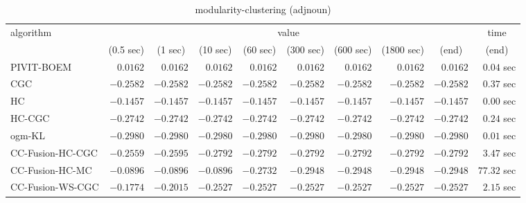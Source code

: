 \begin{table}[H]
\scriptsize
\centering
\caption{modularity-clustering (adjnoun)}
\label{tab:anytimetable-modularity-clustering-adjnoun}
\begin{tabular}{lrrrrrrrrr}
\toprule
           algorithm &                                   \multicolumn{8}{c}{value} & \multicolumn{1}{c}{time}   \\  
\cmidrule(lr){2-9}\cmidrule(lr){10-10}   
                     & \multicolumn{1}{c}{(0.5 sec)} & \multicolumn{1}{c}{(1 sec)} & \multicolumn{1}{c}{(10 sec)} & \multicolumn{1}{c}{(60 sec)} & \multicolumn{1}{c}{(300 sec)} & \multicolumn{1}{c}{(600 sec)} & \multicolumn{1}{c}{(1800 sec)} & \multicolumn{1}{c}{(end)} & \multicolumn{1}{c}{(end)}   \\ \midrule 
          PIVIT-BOEM & $       0.0162$ & $       0.0162$ & $       0.0162$ & $       0.0162$ & $       0.0162$ & $       0.0162$ & $       0.0162$ & $       0.0162$ & $         0.04$ sec   \\ 
                 CGC & $      -0.2582$ & $      -0.2582$ & $      -0.2582$ & $      -0.2582$ & $      -0.2582$ & $      -0.2582$ & $      -0.2582$ & $      -0.2582$ & $         0.37$ sec   \\ 
                  HC & $      -0.1457$ & $      -0.1457$ & $      -0.1457$ & $      -0.1457$ & $      -0.1457$ & $      -0.1457$ & $      -0.1457$ & $      -0.1457$ & $         0.00$ sec   \\ 
              HC-CGC & $      -0.2742$ & $      -0.2742$ & $      -0.2742$ & $      -0.2742$ & $      -0.2742$ & $      -0.2742$ & $      -0.2742$ & $      -0.2742$ & $         0.24$ sec   \\ 
              ogm-KL & $      -0.2980$ & $      -0.2980$ & $      -0.2980$ & $      -0.2980$ & $      -0.2980$ & $      -0.2980$ & $      -0.2980$ & $      -0.2980$ & $         0.01$ sec   \\ 
    CC-Fusion-HC-CGC & $      -0.2559$ & $      -0.2595$ & $      -0.2792$ & $      -0.2792$ & $      -0.2792$ & $      -0.2792$ & $      -0.2792$ & $      -0.2792$ & $         3.47$ sec   \\ 
     CC-Fusion-HC-MC & $      -0.0896$ & $      -0.0896$ & $      -0.0896$ & $      -0.2732$ & $      -0.2948$ & $      -0.2948$ & $      -0.2948$ & $      -0.2948$ & $        77.32$ sec   \\ 
    CC-Fusion-WS-CGC & $      -0.1774$ & $      -0.2015$ & $      -0.2527$ & $      -0.2527$ & $      -0.2527$ & $      -0.2527$ & $      -0.2527$ & $      -0.2527$ & $         2.15$ sec   \\ 

\end{tabular}
\end{table}
